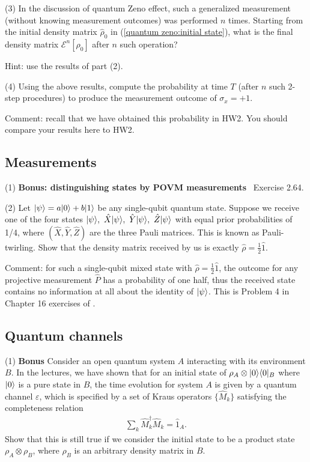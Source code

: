 (3) In the discussion of quantum Zeno effect, such a generalized measurement (without knowing measurement outcomes) was performed $n$ times. Starting from the initial density matrix $\hat\rho_0$ in (\ref{quantum zeno:initial state}), what is the final density matrix $\mathcal{E}^n[\rho_0]$ after $n$ such operation? 

Hint: use the results of part (2). 


(4) Using the above results, compute the probability at time $T$ (after $n$ such 2-step procedures) to produce the measurement outcome of $\sigma_x=+1$. 

Comment: recall that we have obtained this probability in HW2. You should compare your results here to HW2.  

\subsection{Measurements}

(1) \textbf{Bonus: distinguishing states by POVM measurements} \nielsen~Exercise 2.64. 

(2) Let $|{\psi}\rangle=a|{0}\rangle+b|{1}\rangle$ be any single-qubit quantum state. Suppose we receive one of the four states $|{\psi}\rangle,~\hat X|{\psi}\rangle,~\hat Y|{\psi}\rangle,~\hat Z|{\psi}\rangle$ with equal prior probabilities of 1/4, where $(\hat X,\hat Y,\hat Z)$ are the three Pauli matrices. This is known as Pauli-twirling. Show that the density matrix received by us is exactly $\hat\rho=\frac12\hat1$. 


Comment: for such a single-qubit mixed state with $\hat\rho=\frac12\hat1$, the outcome for any projective measurement $\hat P$ has a probability of one half, thus the received state contains no information at all about the identity of $|{\psi}\rangle$. This is Problem 4 in Chapter 16 exercises of \tong. 



\subsection{Quantum channels}

(1) \textbf{Bonus} Consider an open quantum system $A$ interacting with its environment $B$. In the lectures, we have shown that for an initial state of $\rho_A\otimes|{0}\rangle\langle{0}|_B$ where $|{0}\rangle$ is a pure state in $B$, the time evolution for system $A$ is given by a quantum channel $\varepsilon$, which is specified by a set of Kraus operators $\{\hat M_k\}$ satisfying the completeness relation 
\begin{align}
\sum_k\hat M_k^\dagger\hat M_k=\hat 1_A.
\end{align}
Show that this is still true if we consider the initial state to be a product state $\rho_A\otimes\rho_B$, where $\rho_B$ is an arbitrary density matrix in $B$.

